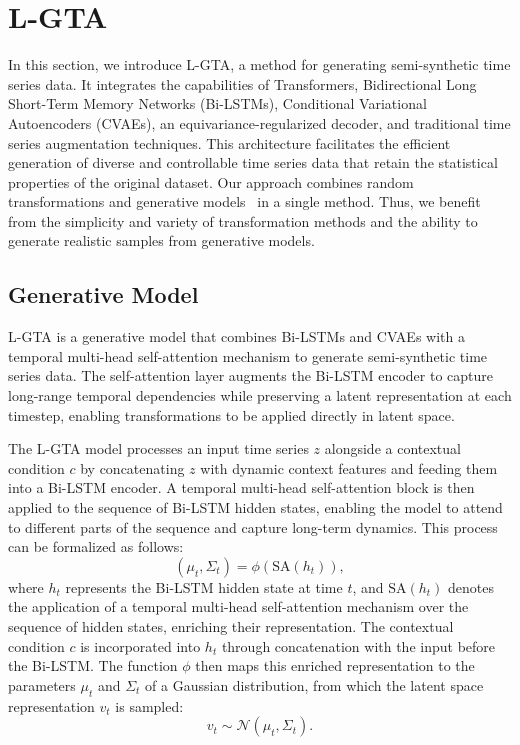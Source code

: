 
\section{L-GTA}
\label{chap:lt_gam}

In this section, we introduce L-GTA, a method for generating semi-synthetic time series data. It integrates the capabilities of Transformers, Bidirectional Long Short-Term Memory Networks (Bi-LSTMs), Conditional Variational Autoencoders (CVAEs), an equivariance-regularized decoder, and traditional time series augmentation techniques. This architecture facilitates the efficient generation of diverse and controllable time series data that retain the statistical properties of the original dataset. Our approach combines random transformations and generative models~\cite{Iwana_2021} in a single method. Thus, we benefit from the simplicity and variety of transformation methods and the ability to generate realistic samples from generative models.


\subsection{Generative Model}
\label{chap:gen_model_architecture}

L-GTA is a generative model that combines Bi-LSTMs and CVAEs with a temporal multi-head self-attention mechanism to generate semi-synthetic time series data. The self-attention layer augments the Bi-LSTM encoder to capture long-range temporal dependencies while preserving a latent representation at each timestep, enabling transformations to be applied directly in latent space.

The L-GTA model processes an input time series $z$ alongside a contextual condition $c$ by concatenating $z$ with dynamic context features and feeding them into a Bi-LSTM encoder. A temporal multi-head self-attention block is then applied to the sequence of Bi-LSTM hidden states, enabling the model to attend to different parts of the sequence and capture long-term dynamics. This process can be formalized as follows:
%
\begin{equation}
\left(\mu_t, \Sigma_t\right) = \phi(\mathrm{SA}(h_t)),
\end{equation}
%
where $h_t$ represents the Bi-LSTM hidden state at time $t$, and $\mathrm{SA}(h_t)$ denotes the application of a temporal multi-head self-attention mechanism over the sequence of hidden states, enriching their representation. The contextual condition $c$ is incorporated into $h_t$ through concatenation with the input before the Bi-LSTM. The function $\phi$ then maps this enriched representation to the parameters $\mu_t$ and $\Sigma_t$ of a Gaussian distribution, from which the latent space representation $v_t$ is sampled:
%
\begin{equation}
v_t \sim \mathcal{N}(\mu_t, \Sigma_t).
\end{equation}

